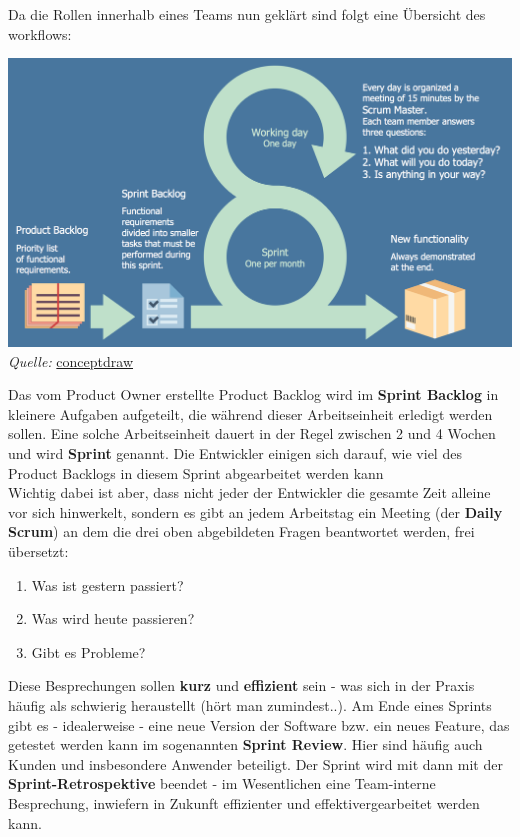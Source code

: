 \documentclass{article}
\begin{document}
Da die Rollen innerhalb eines Teams nun geklärt sind folgt eine Übersicht des workflows: 
\begin{center}
    \includegraphics[scale=0.25]{../../media/scrum-workflow.png} \\
    \textit{Quelle:} \href{https://www.conceptdraw.com/How-To-Guide/scrum-workflow}{conceptdraw}
\end{center}
Das vom Product Owner erstellte Product Backlog wird im \textbf{Sprint Backlog} in kleinere Aufgaben aufgeteilt, die während dieser Arbeitseinheit erledigt werden sollen. Eine solche Arbeitseinheit dauert in der Regel zwischen 2 und 4 Wochen und wird \textbf{Sprint} genannt. Die Entwickler einigen sich darauf, wie viel des Product Backlogs in diesem Sprint abgearbeitet werden kann  \\
Wichtig dabei ist aber, dass nicht jeder der Entwickler die gesamte Zeit alleine vor sich hinwerkelt, sondern es gibt an jedem Arbeitstag ein Meeting (der \textbf{Daily Scrum}) an dem die drei oben abgebildeten Fragen beantwortet werden, frei übersetzt:
\begin{enumerate}
    \item Was ist gestern passiert?
    \item Was wird heute passieren?
    \item Gibt es Probleme?
\end{enumerate}
Diese Besprechungen sollen \textbf{kurz} und \textbf{effizient} sein - was sich in der Praxis häufig als schwierig heraustellt (hört man zumindest..). Am Ende eines Sprints gibt es - idealerweise - eine neue Version der Software bzw. ein neues Feature, das getestet werden kann im sogenannten \textbf{Sprint Review}. Hier sind häufig auch Kunden und insbesondere Anwender beteiligt. Der Sprint wird mit dann mit der \textbf{Sprint-Retrospektive} beendet - im Wesentlichen eine Team-interne Besprechung, inwiefern in Zukunft effizienter und effektivergearbeitet werden kann. \\
\end{document}
